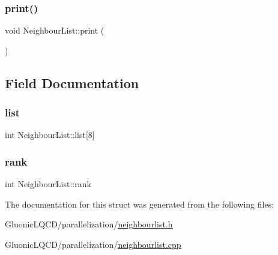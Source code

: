 \mbox{\label{struct_neighbour_list_a9e8123deded59c4c702429fda52af140}} 
\subsubsection{\texorpdfstring{print()}{print()}}
{\footnotesize\ttfamily void Neighbour\+List\+::print (\begin{DoxyParamCaption}{ }\end{DoxyParamCaption})}



\subsection{Field Documentation}
\mbox{\label{struct_neighbour_list_ad55e922aabd4ef75711d22c5e5634165}} 
\subsubsection{\texorpdfstring{list}{list}}
{\footnotesize\ttfamily int Neighbour\+List\+::list\mbox{[}8\mbox{]}}

\mbox{\label{struct_neighbour_list_abe10231f4cd3e607e19cea0b0d7aab03}} 
\subsubsection{\texorpdfstring{rank}{rank}}
{\footnotesize\ttfamily int Neighbour\+List\+::rank}



The documentation for this struct was generated from the following files\+:\begin{DoxyCompactItemize}
\item 
Gluonic\+L\+Q\+C\+D/parallelization/\mbox{\hyperlink{neighbourlist_8h}{neighbourlist.\+h}}\item 
Gluonic\+L\+Q\+C\+D/parallelization/\mbox{\hyperlink{neighbourlist_8cpp}{neighbourlist.\+cpp}}\end{DoxyCompactItemize}
